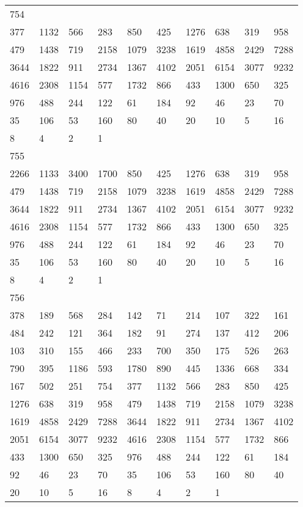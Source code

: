 \begin{longtable}{*{10}{l}}
754&&&&&&&&&\\
377& 1132& 566& 283& 850& 425& 1276& 638& 319& 958\\
479& 1438& 719& 2158& 1079& 3238& 1619& 4858& 2429& 7288\\
3644& 1822& 911& 2734& 1367& 4102& 2051& 6154& 3077& 9232\\
4616& 2308& 1154& 577& 1732& 866& 433& 1300& 650& 325\\
976& 488& 244& 122& 61& 184& 92& 46& 23& 70\\
35& 106& 53& 160& 80& 40& 20& 10& 5& 16\\
8& 4& 2& 1& \\

755&&&&&&&&&\\
2266& 1133& 3400& 1700& 850& 425& 1276& 638& 319& 958\\
479& 1438& 719& 2158& 1079& 3238& 1619& 4858& 2429& 7288\\
3644& 1822& 911& 2734& 1367& 4102& 2051& 6154& 3077& 9232\\
4616& 2308& 1154& 577& 1732& 866& 433& 1300& 650& 325\\
976& 488& 244& 122& 61& 184& 92& 46& 23& 70\\
35& 106& 53& 160& 80& 40& 20& 10& 5& 16\\
8& 4& 2& 1& \\

756&&&&&&&&&\\
378& 189& 568& 284& 142& 71& 214& 107& 322& 161\\
484& 242& 121& 364& 182& 91& 274& 137& 412& 206\\
103& 310& 155& 466& 233& 700& 350& 175& 526& 263\\
790& 395& 1186& 593& 1780& 890& 445& 1336& 668& 334\\
167& 502& 251& 754& 377& 1132& 566& 283& 850& 425\\
1276& 638& 319& 958& 479& 1438& 719& 2158& 1079& 3238\\
1619& 4858& 2429& 7288& 3644& 1822& 911& 2734& 1367& 4102\\
2051& 6154& 3077& 9232& 4616& 2308& 1154& 577& 1732& 866\\
433& 1300& 650& 325& 976& 488& 244& 122& 61& 184\\
92& 46& 23& 70& 35& 106& 53& 160& 80& 40\\
20& 10& 5& 16& 8& 4& 2& 1& \\


\end{longtable}

